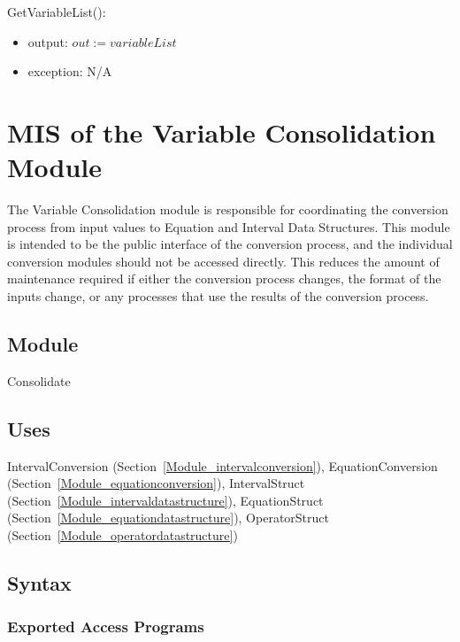 \documentclass[12pt, titlepage]{article}
\begin{document}
\noindent GetVariableList():
\begin{itemize}
	\item output: $out := variableList$
	\item exception: N/A
\end{itemize}

\newpage

\section{MIS of the Variable Consolidation Module} 
\label{Module_variableconsolidation}
The Variable Consolidation module is responsible for coordinating the 
conversion process from input values to Equation and Interval Data Structures. 
This module is intended to be the public interface of the conversion process, 
and the individual conversion modules should not be accessed directly. This 
reduces the amount of maintenance required if either the conversion process 
changes, the format of the inputs change, or any processes that use the results 
of the conversion process.

\subsection{Module}

Consolidate

\subsection{Uses}

IntervalConversion (Section~\ref{Module_intervalconversion}), 
EquationConversion (Section~\ref{Module_equationconversion}), IntervalStruct 
(Section~\ref{Module_intervaldatastructure}), EquationStruct 
(Section~\ref{Module_equationdatastructure}), OperatorStruct 
(Section~\ref{Module_operatordatastructure})


\subsection{Syntax}

\subsubsection{Exported Access Programs}
\end{document}
